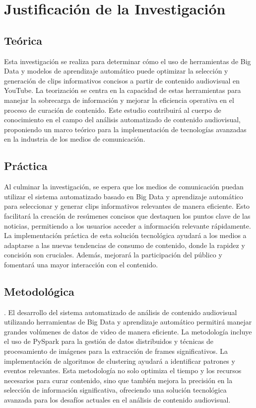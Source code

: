 \section{Justificación de la Investigación}

\subsection{Teórica}Esta investigación se realiza para determinar cómo el uso de herramientas de Big Data y modelos de aprendizaje automático puede optimizar la selección y generación de clips informativos concisos a partir de contenido audiovisual en YouTube. La teorización se centra en la capacidad de estas herramientas para manejar la sobrecarga de información y mejorar la eficiencia operativa en el proceso de curación de contenido. Este estudio contribuirá al cuerpo de conocimiento en el campo del análisis automatizado de contenido audiovisual, proponiendo un marco teórico para la implementación de tecnologías avanzadas en la industria de los medios de comunicación.
\subsection{Práctica}
Al culminar la investigación, se espera que los medios de comunicación puedan utilizar el sistema automatizado basado en Big Data y aprendizaje automático para seleccionar y generar clips informativos relevantes de manera eficiente. Esto facilitará la creación de resúmenes concisos que destaquen los puntos clave de las noticias, permitiendo a los usuarios acceder a información relevante rápidamente. La implementación práctica de esta solución tecnológica ayudará a los medios a adaptarse a las nuevas tendencias de consumo de contenido, donde la rapidez y concisión son cruciales. Además, mejorará la participación del público y fomentará una mayor interacción con el contenido.
\subsection{Metodológica}. 
El desarrollo del sistema automatizado de análisis de contenido audiovisual utilizando herramientas de Big Data y aprendizaje automático permitirá manejar grandes volúmenes de datos de video de manera eficiente. La metodología incluye el uso de PySpark para la gestión de datos distribuidos y técnicas de procesamiento de imágenes para la extracción de frames significativos. La implementación de algoritmos de clustering ayudará a identificar patrones y eventos relevantes. Esta metodología no solo optimiza el tiempo y los recursos necesarios para curar contenido, sino que también mejora la precisión en la selección de información significativa, ofreciendo una solución tecnológica avanzada para los desafíos actuales en el análisis de contenido audiovisual.
